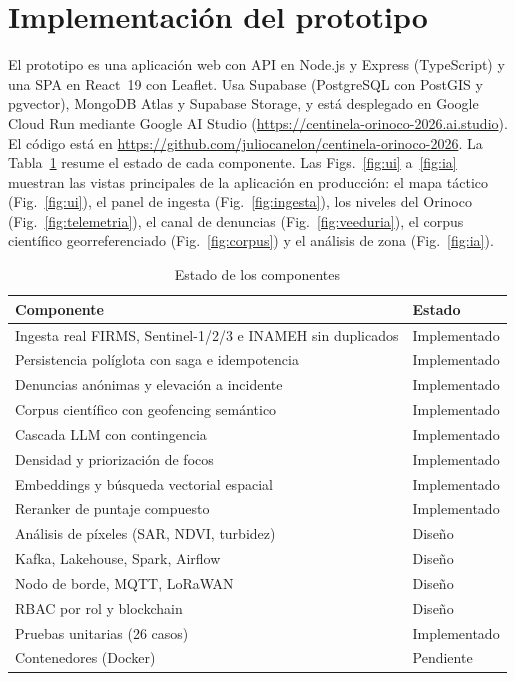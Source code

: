 \documentclass[conference]{IEEEtran}
\begin{document}
\section{Implementación del prototipo}\label{sec:impl}

El prototipo es una aplicación web con API en Node.js y Express (TypeScript) y una SPA en React~19 con Leaflet. Usa Supabase (PostgreSQL con PostGIS y pgvector), MongoDB Atlas y Supabase Storage, y está desplegado en Google Cloud Run mediante Google AI Studio (\url{https://centinela-orinoco-2026.ai.studio}). El código está en \url{https://github.com/juliocanelon/centinela-orinoco-2026}. La Tabla~\ref{tab:estado} resume el estado de cada componente. Las Figs.~\ref{fig:ui} a~\ref{fig:ia} muestran las vistas principales de la aplicación en producción: el mapa táctico (Fig.~\ref{fig:ui}), el panel de ingesta (Fig.~\ref{fig:ingesta}), los niveles del Orinoco (Fig.~\ref{fig:telemetria}), el canal de denuncias (Fig.~\ref{fig:veeduria}), el corpus científico georreferenciado (Fig.~\ref{fig:corpus}) y el análisis de zona (Fig.~\ref{fig:ia}).

\begin{table}[!t]
\caption{Estado de los componentes}
\label{tab:estado}
\centering
\footnotesize
\setlength{\tabcolsep}{3pt}
\begin{tabular}{@{}p{50mm} l@{}}
\toprule
Componente & Estado \\
\midrule
Ingesta real FIRMS, Sentinel-1/2/3 e INAMEH sin duplicados & Implementado \\
Persistencia políglota con saga e idempotencia & Implementado \\
Denuncias anónimas y elevación a incidente & Implementado \\
Corpus científico con geofencing semántico & Implementado \\
Cascada LLM con contingencia & Implementado \\
Densidad y priorización de focos & Implementado \\
Embeddings y búsqueda vectorial espacial & Implementado \\
Reranker de puntaje compuesto & Implementado \\
Análisis de píxeles (SAR, NDVI, turbidez) & Diseño \\
Kafka, Lakehouse, Spark, Airflow & Diseño \\
Nodo de borde, MQTT, LoRaWAN & Diseño \\
RBAC por rol y blockchain & Diseño \\
Pruebas unitarias (26 casos) & Implementado \\
Contenedores (Docker) & Pendiente \\
\bottomrule
\end{tabular}
\end{table}
\end{document}
